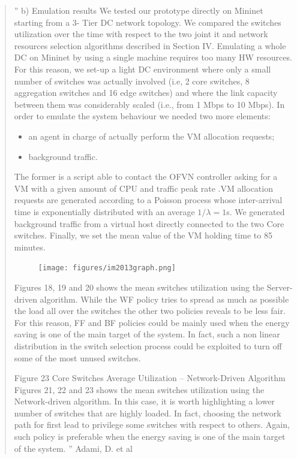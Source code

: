 \documentclass[12pt,english,oneside]{book}
\begin{document}
\begin{quotation}
''
b) Emulation results 
We tested our prototype directly on Mininet starting from a 3-
Tier DC network topology. We compared the switches utilization 
over the time with respect to the two joint it and network 
resources selection algorithms described in Section IV. 
Emulating a whole DC on Mininet by using a single machine 
requires too many HW resources. For this reason, we set-up a 
light DC environment where only a small number of switches 
was actually involved (i.e, 2 core switches, 8 aggregation 
switches and 16 edge switches) and where the link capacity 
between them was considerably scaled (i.e., from 1 Mbps to 10 
Mbps). In order to emulate the system behaviour we needed two 
more elements: 
\begin{itemize}
\item an agent in charge of actually perform the VM allocation 
requests; 
\item background traffic. 
\end{itemize}
The former is a script able to contact the OFVN controller 
asking for a VM with a given amount of CPU and traffic peak 
rate .VM allocation requests are generated according to a Poisson 
process whose inter-arrival time is exponentially distributed with an average $1/\lambda = 1$s.
We generated background traffic from a virtual host directly 
connected to the two Core switches. Finally, we set the mean 
value of the VM holding time to 85 minutes. 


\begin{figure}[h!tbp]
        \centering
        \texttt{[image: figures/im2013graph.png]}
\end{figure}

Figures 18, 19 and 20 shows the mean switches utilization 
using the Server-driven algorithm. While the WF policy tries to 
spread as much as possible the load all over the switches the 
other two policies reveals to be less fair. For this reason, FF and 
BF policies could be mainly used when the energy saving is one 
of the main target of the system. In fact, such a non linear 
distribution in the switch selection process could be exploited to 
turn off some of the most unused switches. 

Figure 23 Core Switches Average Utilization -- Network-Driven Algorithm 
Figures 21, 22 and 23 shows the mean switches utilization 
using the Network-driven algorithm. In this case, it is worth 
highlighting a lower number of switches that are highly loaded. 
In fact, choosing the network path for first lead to privilege some 
switches with respect to others. Again, such policy is preferable 
when the energy saving is one of the main target of the system.
''
\hfill Adami, D. et al \cite{im2013}
\end{quotation}
\end{document}
